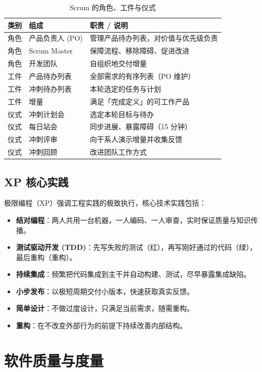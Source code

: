 \begin{table}[H]
\centering
\caption{Scrum 的角色、工件与仪式}
\begin{tabulary}{\textwidth}{LLL}
\toprule
类别 & 组成 & 职责 / 说明 \\
\midrule
角色 & 产品负责人 (PO) & 管理产品待办列表，对价值与优先级负责 \\
角色 & Scrum Master & 保障流程、移除障碍、促进改进 \\
角色 & 开发团队 & 自组织地交付增量 \\
工件 & 产品待办列表 & 全部需求的有序列表（PO 维护） \\
工件 & 冲刺待办列表 & 本轮选定的任务与计划 \\
工件 & 增量 & 满足「完成定义」的可工作产品 \\
仪式 & 冲刺计划会 & 选定本轮目标与待办 \\
仪式 & 每日站会 & 同步进展、暴露障碍（15 分钟） \\
仪式 & 冲刺评审 & 向干系人演示增量并收集反馈 \\
仪式 & 冲刺回顾 & 改进团队工作方式 \\
\bottomrule
\end{tabulary}
\end{table}

\subsection{XP 核心实践}

极限编程（XP）强调工程实践的极致执行，核心技术实践包括：

\begin{itemize}
    \item \textbf{结对编程}：两人共用一台机器，一人编码、一人审查，实时保证质量与知识传播。
    \item \textbf{测试驱动开发 (TDD)}：先写失败的测试（红），再写刚好通过的代码（绿），最后重构（重构）。
    \item \textbf{持续集成}：频繁把代码集成到主干并自动构建、测试，尽早暴露集成缺陷。
    \item \textbf{小步发布}：以极短周期交付小版本，快速获取真实反馈。
    \item \textbf{简单设计}：不做过度设计，只满足当前需求，随需重构。
    \item \textbf{重构}：在不改变外部行为的前提下持续改善内部结构。
\end{itemize}

\section{软件质量与度量}


